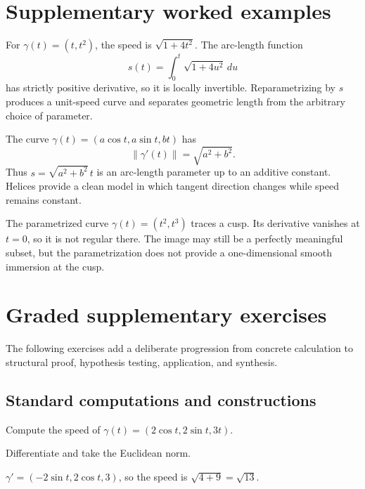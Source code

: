 \section{Supplementary worked examples}
\label{sec:vii12-pedagogy}

\begin{example}\label{ex:vii12-ped-01}
For \(\gamma(t)=(t,t^2)\), the speed is \(\sqrt{1+4t^2}\).  The arc-length function
\[
s(t)=\int_0^t\sqrt{1+4u^2}\,du
\]
has strictly positive derivative, so it is locally invertible.  Reparametrizing by \(s\) produces a unit-speed curve and separates geometric length from the arbitrary choice of parameter.
\end{example}

\begin{example}\label{ex:vii12-ped-02}
The curve \(\gamma(t)=(a\cos t,a\sin t,bt)\) has
\[
\|\gamma'(t)\|=\sqrt{a^2+b^2}.
\]
Thus \(s=\sqrt{a^2+b^2}\,t\) is an arc-length parameter up to an additive constant.  Helices provide a clean model in which tangent direction changes while speed remains constant.
\end{example}

\begin{example}\label{ex:vii12-ped-03}
The parametrized curve \(\gamma(t)=(t^2,t^3)\) traces a cusp.  Its derivative vanishes at \(t=0\), so it is not regular there.  The image may still be a perfectly meaningful subset, but the parametrization does not provide a one-dimensional smooth immersion at the cusp.
\end{example}

\section{Graded supplementary exercises}
The following exercises add a deliberate progression from concrete calculation to structural proof, hypothesis testing, application, and synthesis.

\subsection*{Standard computations and constructions}

\begin{exercise}\label{exr:vii12-ped-01}
Compute the speed of \(\gamma(t)=(2\cos t,2\sin t,3t)\).
\end{exercise}
\begin{hint}
Differentiate and take the Euclidean norm.
\end{hint}
\begin{solution}
\(\gamma'=(-2\sin t,2\cos t,3)\), so the speed is \(\sqrt{4+9}=\sqrt{13}\).
\end{solution}

